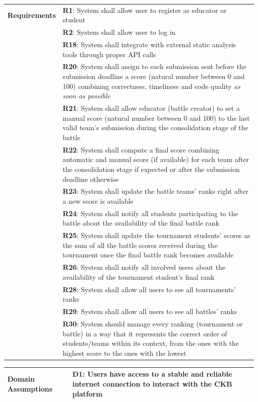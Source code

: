 \begin{center}
    \begin{tabular}{ |m{3cm}|m{10cm}| }
        \hline
        \textbf{Requirements} 
        & \textbf{R1}: System shall allow user to register as educator or student \\
        & \textbf{R2}: System shall allow user to log in \\
        & \textbf{R18}: System shall integrate with external static analysis tools through proper API calls \\
        & \textbf{R20}: System shall assign to each submission sent before the submission deadline a score (natural number between 0 and 100) combining correctness, timeliness and code quality \textit{as soon as possible} \\
        & \textbf{R21}: System shall allow educator (battle creator) to set a manual score (natural number between 0 and 100) to the last valid team’s submission during the consolidation stage of the battle \\
        & \textbf{R22}: System shall compute a final score combining automatic and manual score (if available) for each team after the consolidation stage if expected or after the submission deadline otherwise \\
        & \textbf{R23}: System shall update the battle teams’ ranks right after a new score is available \\
        & \textbf{R24}: System shall notify all students participating to the battle about the availability of the final battle rank \\
        & \textbf{R25}: System shall update the tournament students’ scores as the sum of all the battle scores received during the tournament once the final battle rank becomes available \\
        & \textbf{R26}: System shall notify all involved users about the availability of the tournament student’s final rank \\
        & \textbf{R28}: System shall allow all users to see all tournaments’ ranks \\
        & \textbf{R29}: System shall allow all users to see all battles' ranks \\
        & \textbf{R30}: System should manage every ranking (tournament or battle) in a way that it represents the correct order of students/teams within its context, from the ones with the highest score to the ones with the lowest \\    
        \hline
    \end{tabular}
    \begin{tabular}{ |m{3cm}|m{10cm}| }
        \hline
        \textbf{Domain \newline Assumptions} 
        & \textbf{D1}: Users have access to a stable and reliable internet connection to interact with the CKB platform \\
        \hline
    \end{tabular}
\end{center} 

